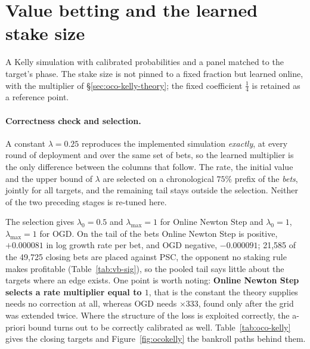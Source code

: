 \documentclass[12pt,a4paper,oneside]{report}
\renewcommand{\_}{\oldunderscore\allowbreak}
\theoremstyle{definition}
\theoremstyle{plain}
\theoremstyle{definition}   %
\begin{document}
\section{Value betting and the learned stake size}
\label{sec:res-value}

A Kelly simulation with calibrated probabilities and a panel matched to the target's phase. The
stake size is not pinned to a fixed fraction but learned online, with the multiplier of
\S\ref{sec:oco-kelly-theory}; the fixed coefficient $\tfrac14$ is retained as a reference point.

\paragraph{Correctness check and selection.} A constant $\lambda = 0.25$ reproduces the
implemented simulation \emph{exactly}, at every round of deployment and over the same set of
bets, so the learned multiplier is the only difference between the columns that follow. The rate,
the initial value and the upper bound of $\lambda$ are selected on a chronological $75\%$ prefix
of the \emph{bets}, jointly for all targets, and the remaining tail stays outside the selection.
Neither of the two preceding stages is re-tuned here.

The selection gives $\lambda_0 = 0.5$ and $\lambda_{\max} = 1$ for Online Newton Step and
$\lambda_0 = 1$, $\lambda_{\max} = 1$ for OGD. On the tail of the bets Online Newton Step is
positive, $+0.000081$ in log growth rate per bet, and OGD negative, $-0.000091$; 21,585 of the
49,725 closing bets are placed against PSC, the opponent no staking rule makes profitable
(Table~\ref{tab:vb-sig}), so the pooled tail says little about the targets where an edge exists.
One point is worth noting: \textbf{Online Newton Step selects a rate multiplier equal to $1$},
that is the constant the theory supplies needs no correction at all, whereas OGD needs
$\times 333$, found only after the grid was extended twice. Where the structure of the loss is
exploited correctly, the a-priori bound turns out to be correctly calibrated as well.
Table~\ref{tab:oco-kelly} gives the closing targets and Figure~\ref{fig:ocokelly} the
bankroll paths behind them.
\end{document}
